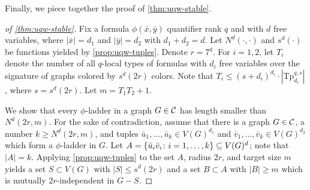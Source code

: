 Finally, we piece together the proof of \cref{thm:uqw-stable}. 

\begin{proof}[of \cref{thm:uqw-stable}]
Fix a formula  $\phi(\bar x,\bar y)$ quantifier rank $q$ and with $d$ free variables, where $|\bar x|=d_1$ and $|\bar y|=d_2$ with $d_1+d_2=d$.
Let $N^d(\cdot,\cdot)$ and $s^d(\cdot)$ be functions yielded by \cref{prop:uqw-tuples}.
Denote $r=7^q$.
For $i=1,2$, let $T_i$ denote the number of all $q$-local types of 
formulas with $d_i$ free variables over the signature of graphs colored by $s^d(2r)$ colors. Note that $T_i\le (s+d_i)^{d_i}\cdot |\mathrm{Tp}_{d_i}^{q,s}|$, where $s=s^d(2r)$.
Let $m=T_1T_2+1$. 

We show that 
every $\phi$-ladder in a graph $G\in\cal C$ has length smaller than $N^d(2r,m)$. 
For the sake of contradiction, assume that there is a graph $G\in\cal C$, a number $k\ge N^d(2r,m)$,
and tuples $\bar u_1,\ldots,\bar u_k\in V(G)^{d_1}$ and $\bar v_1,\ldots,\bar v_k\in V(G)^{d_2}$
which form a $\phi$-ladder in $G$.
	Let $A=\set{\bar u_i\bar v_i\colon i=1,\ldots,k}\subset V(G)^d$; note that $|A|=k$.
Applying \cref{prop:uqw-tuples} to the set $A$, radius $2r$, and target size $m$
		 yields a set $S\subset V(G)$ with $|S|\le s^d(2r)$
	and a set $B\subset A$ with $|B|\geq m$ which is mutually $2r$-independent in $G-S$.
%
%
%

\end{proof}
